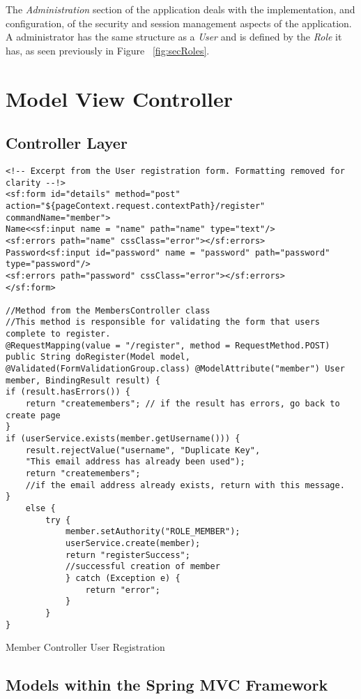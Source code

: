 The \textit{Administration} section of the application deals with the implementation, and configuration, of the security and session management aspects of the application. A administrator has the same structure as a \textit{User} and is defined by the \textit{Role} it has, as seen previously in Figure ~\ref{fig:secRoles}.

\section{Model View Controller}
\subsection{Controller Layer}

\begin{table}[H]
\begin{lstlisting}
<!-- Excerpt from the User registration form. Formatting removed for clarity --!>
<sf:form id="details" method="post" action="${pageContext.request.contextPath}/register" commandName="member">
Name<<sf:input name = "name" path="name" type="text"/>
<sf:errors path="name" cssClass="error"></sf:errors>
Password<sf:input id="password" name = "password" path="password" type="password"/>
<sf:errors path="password" cssClass="error"></sf:errors>
</sf:form>

//Method from the MembersController class
//This method is responsible for validating the form that users complete to register.
@RequestMapping(value = "/register", method = RequestMethod.POST)
public String doRegister(Model model,
@Validated(FormValidationGroup.class) @ModelAttribute("member") User member, BindingResult result) {
if (result.hasErrors()) {
	return "createmembers"; // if the result has errors, go back to create page
}
if (userService.exists(member.getUsername())) {
	result.rejectValue("username", "Duplicate Key",
	"This email address has already been used");
	return "createmembers";
	//if the email address already exists, return with this message.
}
	else {
		try {
			member.setAuthority("ROLE_MEMBER");
			userService.create(member);
			return "registerSuccess";
			//successful creation of member
			} catch (Exception e) {
				return "error";
			}
		}
}
\end{lstlisting}
\caption{Member Controller User Registration}
\label{fig:memberController}
\end{table}

\subsection{Models within the Spring MVC Framework}

